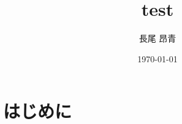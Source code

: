 \documentclass[a4paper,11pt]{ltjsarticle}
\begin{document}
\title{test}
\author{長尾 昂青}
\date{\today}
\maketitle

\tableofcontents

\newpage
\section{はじめに}


% 
% 
\printbibliography%
\end{document}
